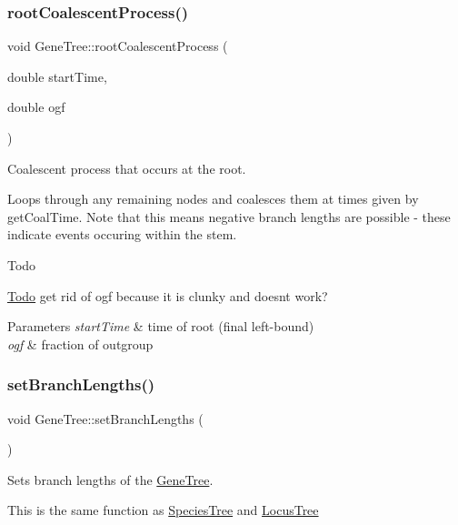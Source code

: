 \subsubsection{\texorpdfstring{rootCoalescentProcess()}{rootCoalescentProcess()}}
{\footnotesize\ttfamily void Gene\+Tree\+::root\+Coalescent\+Process (\begin{DoxyParamCaption}\item[{double}]{start\+Time,  }\item[{double}]{ogf }\end{DoxyParamCaption})}



Coalescent process that occurs at the root. 

Loops through any remaining nodes and coalesces them at times given by get\+Coal\+Time. Note that this means negative branch lengths are possible -\/ these indicate events occuring within the stem.

\begin{DoxyRefDesc}{Todo}
\item[\mbox{\hyperlink{todo__todo000003}{Todo}}]get rid of ogf because it is clunky and doesn\textquotesingle{}t work? \end{DoxyRefDesc}

\begin{DoxyParams}{Parameters}
{\em start\+Time} & time of root (final left-\/bound) \\
\hline
{\em ogf} & fraction of outgroup \\
\hline
\end{DoxyParams}
\mbox{\label{class_gene_tree_a3c0dbf4e22df508a00bb814c68f7fe54}} 
\subsubsection{\texorpdfstring{setBranchLengths()}{setBranchLengths()}}
{\footnotesize\ttfamily void Gene\+Tree\+::set\+Branch\+Lengths (\begin{DoxyParamCaption}{ }\end{DoxyParamCaption})\hspace{0.3cm}{\ttfamily [virtual]}}



Sets branch lengths of the \mbox{\hyperlink{class_gene_tree}{Gene\+Tree}}. 

This is the same function as \mbox{\hyperlink{class_species_tree}{Species\+Tree}} and \mbox{\hyperlink{class_locus_tree}{Locus\+Tree}} 


